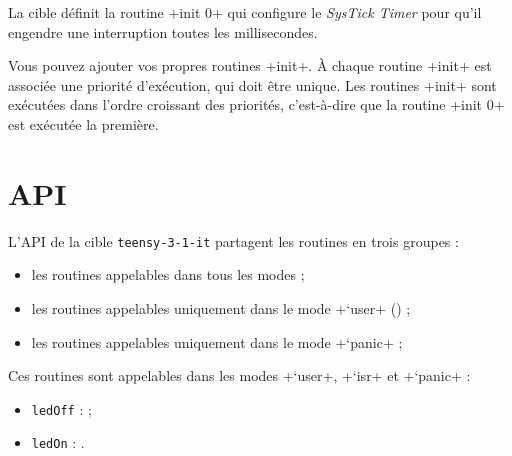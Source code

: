 
La cible définit la routine \plm+init 0+ qui configure le \emph{SysTick Timer} pour qu'il engendre une interruption toutes les millisecondes.

Vous pouvez ajouter vos propres routines \plm+init+. À chaque routine \plm+init+ est associée une priorité d'exécution, qui doit être unique. Les routines \plm+init+ sont exécutées dans l'ordre croissant des priorités, c'est-à-dire que la routine \plm+init 0+ est exécutée la première.












\section{API}

L'API de la cible \texttt{teensy-3-1-it} partagent les routines en trois groupes :
\begin{itemize}
  \item les routines appelables dans tous les modes ;
  \item les routines appelables uniquement dans le mode \plm+`user+ () ;
  \item les routines appelables uniquement dans le mode \plm+`panic+ ;
\end{itemize}


Ces routines sont appelables dans les modes \plm+`user+, \plm+`isr+ et \plm+`panic+ :
\begin{itemize}
\item \texttt{ledOff} :  ;
\item \texttt{ledOn} : .
\end{itemize}





